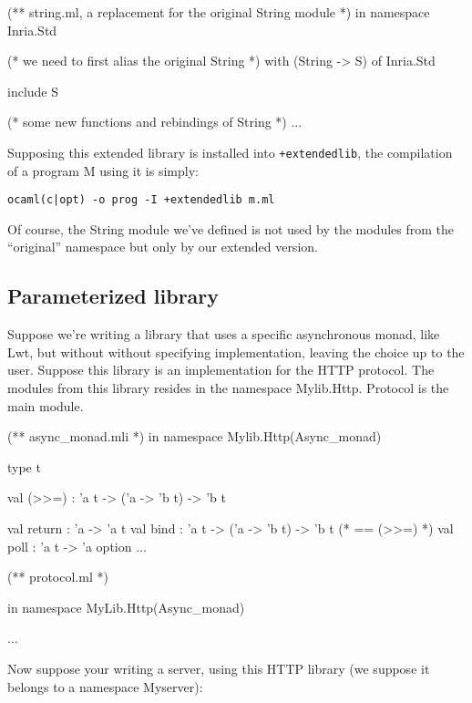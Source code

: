 \documentclass[11pt,a4paper]{article}
\begin{document}
\begin{OCaml}
(** string.ml, a replacement for the original String module *)
in namespace Inria.Std

(* we need to first alias the original String *)
  with (String -> S) of Inria.Std

include S

(* some new functions and rebindings of String *)
...
\end{OCaml}

Supposing this extended library is installed into \texttt{+extendedlib}, the
compilation of a program M using it is simply:
\begin{verbatim}
ocaml(c|opt) -o prog -I +extendedlib m.ml
\end{verbatim}

Of course, the String module we've defined is not used by the modules from the
``original'' namespace but only by our extended version.

\subsection{Parameterized library}

Suppose we're writing a library that uses a specific asynchronous monad, like
Lwt, but without without specifying implementation, leaving the choice up to the
user. Suppose this library is an implementation for the HTTP protocol. The modules
from this library resides in the namespace Mylib.Http. Protocol is the main module.

\begin{OCaml}
(** async_monad.mli *)
in namespace Mylib.Http(Async_monad)

type t

val (>>=) : 'a t -> ('a -> 'b t) -> 'b t

val return : 'a -> 'a t
val bind : 'a t -> ('a -> 'b t) -> 'b t (* == (>>=) *)
val poll : 'a t -> 'a option
...
\end{OCaml}

\medskip

\begin{OCaml}
(** protocol.ml *)

in namespace MyLib.Http(Async_monad)

...
\end{OCaml}

\medskip

Now suppose your writing a server, using this HTTP library (we suppose it belongs
to a namespace Myserver):
\end{document}
